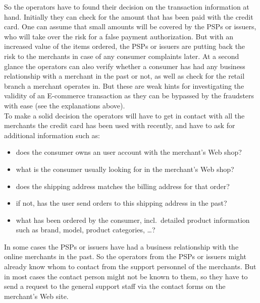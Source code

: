 So the operators have to found their decision on the transaction information at hand. Initially they can check for the amount that has been paid with the credit card. One can assume that small amounts will be covered by the \gls{PSP}s or issuers, who will take over the risk for a false payment authorization. But with an increased value of the items ordered, the \gls{PSP}s or issuers are putting back the risk to the merchants in case of any consumer complaints later. At a second glance the operators can also verify whether a consumer has had any business relationship with a merchant in the past or not, as well as check for the retail branch a merchant operates in. But these are weak hints for investigating the validity of an \gls{E-commerce} transaction as they can be bypassed by the fraudsters with ease (see the explanations above). \\

To make a solid decision the operators will have to get in contact with all the merchants the credit card has been used with recently, and have to ask for additional information such as:\@

\begin{itemize}
  \item does the consumer owns an user account with the merchant's Web shop?
  \item what is the consumer usually looking for in the merchant's Web shop?
  \item does the shipping address matches the billing address for that order?
  \item if not, has the user send orders to this shipping address in the past?
  \item what has been ordered by the consumer, incl.\ detailed product information such as brand, model, product categories, \ldots?
\end{itemize}

In some cases the \gls{PSP}s or issuers have had a business relationship with the online merchants in the past. So the operators from the \gls{PSP}s or issuers might already know whom to contact from the support personnel of the merchants. But in most cases the contact person might not be known to them, so they have to send a request to the general support staff via the contact forms on the merchant's Web site. \\

